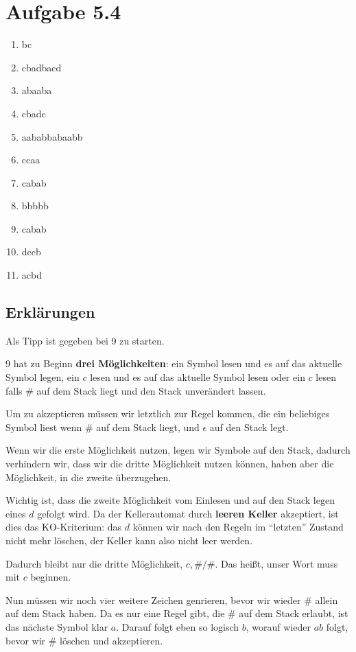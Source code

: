 \documentclass{article}
\begin{document}
\section*{Aufgabe 5.4}
\begin{enumerate}
	\item bc
	\item cbadbacd
	\item abaaba
	\item cbadc
	\item aababbabaabb
	\item ccaa
	\item cabab
	\item bbbbb
  \item cabab
	\item dccb
  \item acbd
\end{enumerate}

\subsection*{Erklärungen}
Als Tipp ist gegeben bei 9 zu starten.

\bigskip

9 hat zu Beginn \textbf{drei Möglichkeiten}: ein Symbol lesen und es auf das aktuelle Symbol legen, ein $c$ lesen und es auf das aktuelle Symbol lesen oder ein $c$ lesen falls \# auf dem Stack liegt und den Stack unverändert lassen.

Um zu akzeptieren müssen wir letztlich zur Regel kommen, die ein beliebiges Symbol liest wenn \# auf dem Stack liegt, und $\epsilon$ auf den Stack legt.

Wenn wir die erste Möglichkeit nutzen, legen wir Symbole auf den Stack, dadurch verhindern wir, dass wir die dritte Möglichkeit nutzen können, haben aber die Möglichkeit, in die zweite überzugehen.

Wichtig ist, dass die zweite Möglichkeit vom Einlesen und auf den Stack legen eines $d$ gefolgt wird. Da der Kellerautomat durch \textbf{leeren Keller} akzeptiert, ist dies das KO-Kriterium: das $d$ können wir nach den Regeln im ``letzten'' Zustand nicht mehr löschen, der Keller kann also nicht leer werden.

Dadurch bleibt nur die dritte Möglichkeit, $c,\#/\#$. Das heißt, unser Wort muss mit $c$ beginnen.

Nun müssen wir noch vier weitere Zeichen genrieren, bevor wir wieder \# allein auf dem Stack haben. Da es nur eine Regel gibt, die \# auf dem Stack erlaubt, ist das nächste Symbol klar $a$. Darauf folgt eben so logisch $b$, worauf wieder $ab$ folgt, bevor wir \# löschen und akzeptieren.
\end{document}
